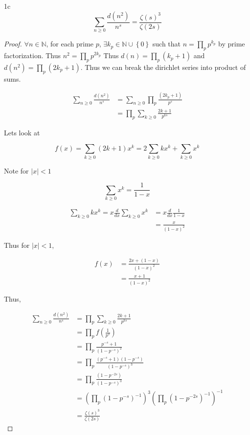 \documentclass{article}
\newcommand{\N}{\mathbb{N}}
\newcommand{\abs}[1]{\left\lvert #1\right\rvert}
\begin{document}
\begin{claim}{1c}\label{Claim 1c.}
    \[\sum_{n \geq 0}\frac{d(n^2)}{n^s} = \frac{\zeta{(s)}^3}{\zeta(2s)}\]
\end{claim}
\begin{proof}
    $\forall n \in \N$, for each prime $p$, $\exists k_p \in \N \cup \left\{ 0 \right\}$ such that $n = \prod_{p} p^{k_p}$ by prime factorization. Thus $n^2 = \prod_{p} p^{2k_p}$ Thus $d(n) = \prod_{p}(k_p + 1)$ and $d(n^2) = \prod_p (2k_p + 1)$. Thus we can break the dirichlet series into product of sums. 
    
    \begin{align*}
        \sum_{n \geq 0} \frac{d(n^2)}{n^s} &= \sum_{n \geq 0}\prod_{p}\frac{(2k_p + 1)}{p^s} \\
        &= \prod_{p} \sum_{k \geq 0} \frac{2k + 1}{p^{ks}}
    \end{align*}

    Lets look at 

    \[f(x) = \sum_{k \geq 0}(2k + 1) x^k = 2\sum_{k \geq 0} k x^k + \sum_{k \geq 0} x^k\]

    Note for $\abs{x} < 1$ 

    \[\sum_{k \geq 0}x^k = \frac{1}{1 - x}\]

    \begin{align*}
        \sum_{k \geq 0} k x^k = x\frac{d}{dx} \sum_{k \geq 0} x^k &= x \frac{d}{dx} \frac{1}{1 - x} \\
        &= \frac{x}{(1 - x)^2}
    \end{align*}

    Thus for $\abs{x} < 1$, 
    
    \begin{align*}
        f(x) &= \frac{2x + (1 - x)}{(1 - x)^2} \\
        &= \frac{x + 1}{(1 - x)^2}
    \end{align*} 

    Thus,

    \begin{align*}
        \sum_{n \geq 0} \frac{d(n^2)}{n^s} &= \prod_{p} \sum_{k \geq 0} \frac{2k + 1}{p^{ks}} \\
        &= \prod_{p} f\left(\frac{1}{p^s}\right) \\
        &= \prod_{p} \frac{p^{-s} + 1}{(1 - p^{-s})^2} \\
        &= \prod_{p} \frac{(p^{-s} + 1)(1 - p^{-s})}{(1 - p^{-s})^3} \\
        &= \prod_{p} \frac{(1 - p^{-2s})}{(1 - p^{-s})^3} \\
        &= \left(\prod_{p}(1 - p^{-s})^{-1}\right)^3 \left(\prod_{p}(1 - p^{-2s})^{-1}\right)^{-1} \\
        &= \frac{\zeta{(s)}^3}{\zeta(2s)}
    \end{align*}
\end{proof}
\end{document}
